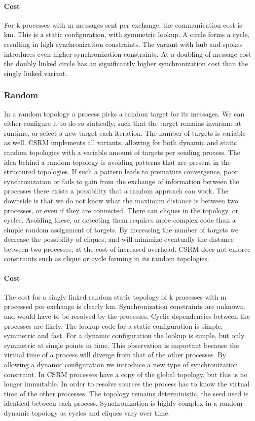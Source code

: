 \paragraph{Cost}
For k processes with m messages sent per exchange, the communication cost is km. This is a static configuration, with symmetric lookup. A circle forms a cycle, resulting in high synchronization constraints. The variant with hub and spokes introduces even higher synchronization constraints. At a doubling of message cost the doubly linked circle has an significantly higher synchronization cost than the singly linked variant. 
\subsubsection{Random}
In a random topology a process picks a random target for its messages. We can either configure it to do so statically, such that the target remains invariant at runtime, or select a new target each iteration. The number of targets is variable as well. CSRM implements all variants, allowing for both dynamic and static random topologies with a variable amount of targets per sending process. The idea behind a random topology is avoiding patterns that are present in the structured topologies. If such a pattern leads to premature convergence, poor synchronization or fails to gain from the exchange of information between the processes there exists a possibility that a random approach can work. The downside is that we do not know what the maximum distance is between two processes, or even if they are connected. There can cliques in the topology, or cycles. Avoiding these, or detecting them requires more complex code than a simple random assignment of targets. By increasing the number of targets we decrease the possibility of cliques, and will minimize eventually the distance between two processes, at the cost of increased overhead.
CSRM does not enforce constraints such as clique or cycle forming in its random topologies.
\paragraph{Cost}
The cost for a singly linked random static topology of k processes with m processed per exchange is clearly km. Synchronization constraints are unknown, and would have to be resolved by the processes. Cyclic dependencies between the processes are likely.
The lookup code for a static configuration is simple, symmetric and fast. For a dynamic configuration the lookup is simple, but only symmetric at single points in time. This observation is important because the virtual time of a process will diverge from that of the other processes. By allowing a dynamic configuration we introduce a new type of synchronization constraint. In CSRM processes have a copy of the global topology, but this is no longer immutable. In order to resolve sources the process has to know the virtual time of the other processes. The topology remains deterministic, the seed used is identical between each process. Synchronization is highly complex in a random dynamic topology as cycles and cliques vary over time.
